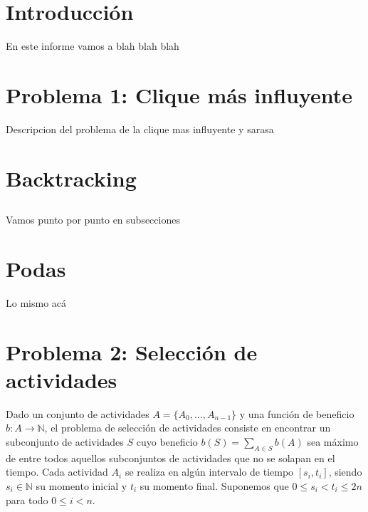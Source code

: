 \documentclass[10pt, a4paper]{article}
\begin{document}


\maketitle


\section*{Introducción}

En este informe vamos a blah blah blah

\section*{Problema 1: Clique más influyente}

Descripcion del problema de la clique mas influyente y sarasa

\section{Backtracking}

\subsection{}
Vamos punto por punto en subsecciones

\section{Podas}
Lo mismo acá

\section*{Problema 2: Selección de actividades}
Dado un conjunto de actividades $A = \{A_0, ... , A_{n-1}\}$ y una función de beneficio $b: A \rightarrow \mathbb{N}$, el problema de selección de actividades consiste en encontrar un subconjunto de actividades $S$ cuyo beneficio $b(S) = \sum_{A \in S} b(A)$ sea máximo de entre todos aquellos subconjuntos de actividades que no se solapan en el tiempo. Cada actividad $A_i$ se realiza en algún intervalo de tiempo $[ s_i , t_i ]$, siendo $s_i \in \mathbb{N}$ su momento inicial y $t_i$ su momento final. Suponemos que $0 \leq s_i < t_i \leq 2n$ para todo $0 \leq i < n$.
\end{document}
